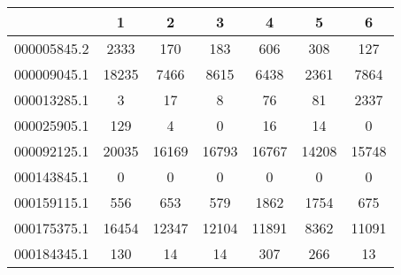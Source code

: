 \begin{adjustbox}{center}
\begin{tabular}{|l||c|c|c|c|c|c|}
\hline
& 1 & 2 & 3 & 4 & 5 & 6 \\
\hline
\hline
000005845.2 & \cellcolor[RGB]{235, 71, 71} 2333 & \cellcolor[RGB]{232, 232, 252} 170 & \cellcolor[RGB]{237, 237, 253} 183 & \cellcolor[RGB]{235, 71, 71} 606 & \cellcolor[RGB]{252, 232, 232} 308 & \cellcolor[RGB]{218, 218, 251} 127 \\
\hline
000009045.1 & \cellcolor[RGB]{235, 71, 71} 18235 & \cellcolor[RGB]{250, 250, 254} 7466 & \cellcolor[RGB]{251, 218, 218} 8615 & \cellcolor[RGB]{223, 223, 251} 6438 & \cellcolor[RGB]{94, 94, 237} 2361 & \cellcolor[RGB]{254, 246, 246} 7864 \\
\hline
000013285.1 & \cellcolor[RGB]{227, 227, 252} 3 & \cellcolor[RGB]{237, 237, 253} 17 & \cellcolor[RGB]{232, 232, 252} 8 & \cellcolor[RGB]{253, 237, 237} 76 & \cellcolor[RGB]{252, 232, 232} 81 & \cellcolor[RGB]{235, 71, 71} 2337 \\
\hline
000025905.1 & \cellcolor[RGB]{235, 71, 71} 129 & \cellcolor[RGB]{241, 241, 253} 4 & \cellcolor[RGB]{227, 227, 252} 0 & \cellcolor[RGB]{252, 232, 232} 16 & \cellcolor[RGB]{253, 237, 237} 14 & \cellcolor[RGB]{227, 227, 252} 0 \\
\hline
000092125.1 & \cellcolor[RGB]{235, 71, 71} 20035 & \cellcolor[RGB]{241, 241, 253} 16169 & \cellcolor[RGB]{253, 237, 237} 16793 & \cellcolor[RGB]{253, 241, 241} 16767 & \cellcolor[RGB]{94, 94, 237} 14208 & \cellcolor[RGB]{227, 227, 252} 15748 \\
\hline
000143845.1 & \cellcolor[RGB]{255, 255, 255} 0 & \cellcolor[RGB]{255, 255, 255} 0 & \cellcolor[RGB]{255, 255, 255} 0 & \cellcolor[RGB]{255, 255, 255} 0 & \cellcolor[RGB]{255, 255, 255} 0 & \cellcolor[RGB]{255, 255, 255} 0 \\
\hline
000159115.1 & \cellcolor[RGB]{214, 214, 250} 556 & \cellcolor[RGB]{250, 250, 254} 653 & \cellcolor[RGB]{223, 223, 251} 579 & \cellcolor[RGB]{235, 71, 71} 1862 & \cellcolor[RGB]{235, 71, 71} 1754 & \cellcolor[RGB]{254, 250, 250} 675 \\
\hline
000175375.1 & \cellcolor[RGB]{235, 71, 71} 16454 & \cellcolor[RGB]{253, 237, 237} 12347 & \cellcolor[RGB]{254, 250, 250} 12104 & \cellcolor[RGB]{250, 250, 254} 11891 & \cellcolor[RGB]{94, 94, 237} 8362 & \cellcolor[RGB]{223, 223, 251} 11091 \\
\hline
000184345.1 & \cellcolor[RGB]{252, 232, 232} 130 & \cellcolor[RGB]{232, 232, 252} 14 & \cellcolor[RGB]{232, 232, 252} 14 & \cellcolor[RGB]{235, 71, 71} 307 & \cellcolor[RGB]{246, 177, 177} 266 & \cellcolor[RGB]{232, 232, 252} 13 \\

\end{tabular}
\end{adjustbox}
